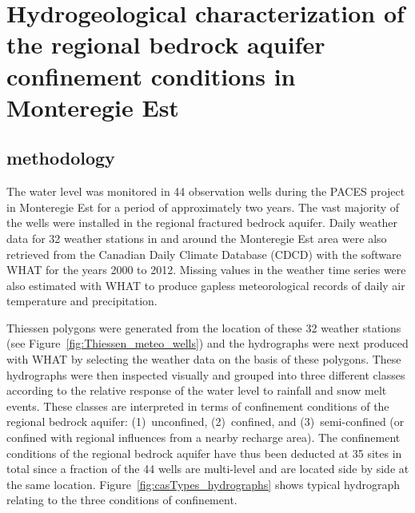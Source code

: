 \documentclass[WHATMANUAL.tex]{subfiles}
\begin{document}
\chapter[Hydrogeological characterization of the regional bedrock aquifer confinement conditions in Monteregie Est]{Hydrogeological characterization of the regional bedrock aquifer confinement conditions in Monteregie Est\footnotemark}\label{app:confinement_cond_in_MontEst}



\section{methodology}

The water level was monitored in 44 observation wells during the PACES project in Monteregie Est for a period of approximately two years. The vast majority of the wells were installed in the regional fractured bedrock aquifer. Daily weather data for 32 weather stations in and around the Monteregie Est area were also retrieved from the Canadian Daily Climate Database (CDCD) with the software WHAT for the years 2000 to 2012. Missing values in the weather time series were also estimated with WHAT to produce gapless meteorological records of daily air temperature and precipitation.
 
Thiessen polygons were generated from the location of these 32 weather stations (see Figure~\ref{fig:Thiessen_meteo_wells}) and the hydrographs were next produced with WHAT by selecting the weather data on the basis of these polygons. These hydrographs were then inspected visually and grouped into three different classes according to the relative response of the water level to rainfall and snow melt events. These classes are interpreted in terms of confinement conditions of the regional bedrock aquifer: (1)~unconfined, (2)~confined, and (3)~semi-confined (or confined with regional influences from a nearby recharge area). The confinement conditions of the regional bedrock aquifer have thus been deducted at 35 sites in total since a fraction of the 44 wells are multi-level and are located side by side at the same location. Figure~\ref{fig:casTypes_hydrographs} shows typical hydrograph relating to the three conditions of confinement.
\end{document}
